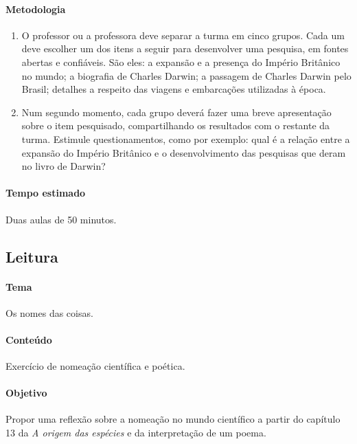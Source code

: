 \documentclass[11pt]{extarticle}
\begin{document}
\paragraph{Metodologia}

\begin{enumerate}

	\item
	O professor ou a professora deve separar a turma em cinco grupos. Cada um deve escolher
	um dos itens a seguir para desenvolver uma pesquisa, em fontes abertas e confiáveis.
	São eles: 	a expansão e a presença do Império Britânico no mundo; a biografia
	de Charles Darwin; a passagem de Charles Darwin pelo Brasil;
	detalhes a respeito das viagens e embarcações utilizadas à época.
	
	\item
	Num segundo momento, cada grupo deverá fazer uma breve apresentação sobre 
	o item pesquisado, compartilhando os resultados com o restante da turma.
	Estimule questionamentos, como por exemplo: qual é a relação entre
	a expansão do Império Britânico e o desenvolvimento das pesquisas
	que deram no livro de Darwin? 

\end{enumerate}

\paragraph{Tempo estimado} Duas aulas de 50 minutos.


\subsection{Leitura}

\paragraph{Tema} Os nomes das coisas.

\paragraph{Conteúdo} Exercício de nomeação científica e poética.

\paragraph{Objetivo} Propor uma reflexão sobre a nomeação no mundo científico
a partir do capítulo 13 da \emph{A origem das espécies} e da interpretação de um poema. 
\end{document}
